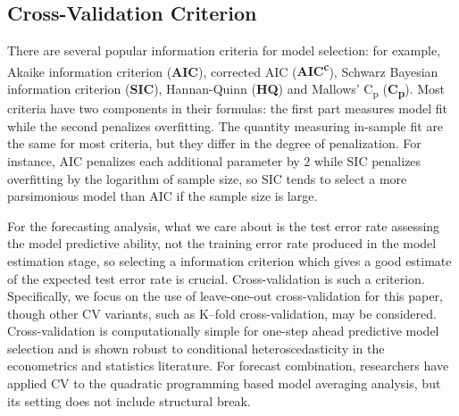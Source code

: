 \subsection{Cross-Validation Criterion}
There are several popular information criteria for model selection: for example, Akaike information criterion (\textbf{AIC}), corrected AIC (\textbf{AIC\textsuperscript{c}}), Schwarz Bayesian information criterion (\textbf{SIC}), Hannan-Quinn (\textbf{HQ}) and Mallows' C\textsubscript{p} (\textbf{C\textsubscript{p}}). Most criteria have two components in their formulas: the first part measures model fit while the second penalizes overfitting. The quantity measuring in-sample fit are the same for most criteria, but they differ in the degree of penalization. For instance, AIC penalizes each additional parameter by $2$ while SIC penalizes overfitting by the logarithm of sample size, so SIC tends to select a more parsimonious model than AIC if the sample size is large.

For the forecasting analysis, what we care about is the test error rate assessing the model predictive ability, not the training error rate produced in the model estimation stage, so selecting a information criterion which gives a good estimate of the expected test error rate is crucial. Cross-validation is such a criterion. Specifically, we focus on the use of leave-one-out cross-validation for this paper, though other CV variants, such as K--fold cross-validation, may be considered. Cross-validation is computationally simple for one-step ahead predictive model selection and is shown robust to conditional heteroscedasticity in the econometrics and statistics literature. For forecast combination, researchers have applied CV to the quadratic programming based model averaging analysis, but its setting does not include structural break.

